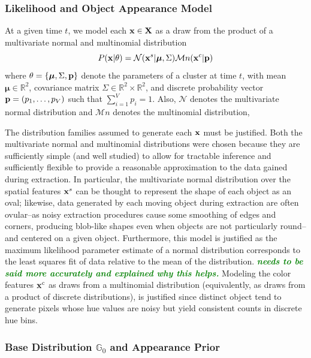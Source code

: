 \documentclass[smallcondensed, final]{svjour3}
\newcommand{\willie}[1]{\textcolor{green}{\textsf{\emph{\textbf{\textcolor{green}{#1}}}}}}
\begin{document}
\subsubsection{Likelihood and Object Appearance Model}

At a given time $t$, we model each $\bold{x} \in \bold{X}$ as a draw from the product of a multivariate normal and multinomial distribution
\begin{equation}
P(\bold{x}|\theta) = \mathcal{N}(\bold{x}^{s} | \boldsymbol{\mu}, \Sigma)  \mathcal{M}n(\bold{x}^{c} | \bold{p})
\end{equation}
where $\theta = \{ \boldsymbol{\mu}, \Sigma, \bold{p} \}$ denote the parameters of a cluster at time $t$, with mean $\boldsymbol{\mu} \in \mathbb{R}^{2}$, covariance matrix $\Sigma \in \mathbb{R}^{2} \times \mathbb{R}^{2}$, and discrete probability vector $\bold{p} = (p_{1}, \ldots, p_{V})$ such that $\sum_{i=1}^{V}p_{i} = 1$. Also, $\mathcal{N}$ denotes the multivariate normal distribution and $\mathcal{M}n$ denotes the multinomial distribution, 

The distribution families assumed to generate each $\bold{x}$ must be justified. Both the multivariate normal and multinomial distributions were chosen because they are sufficiently simple (and well studied) to allow for tractable inference and sufficiently flexible to provide a reasonable approximation to the data gained during extraction. In particular, the multivariate normal distribution over the spatial features $\bold{x}^{s}$ can be thought to represent the shape of each object as an oval; likewise, data generated by each moving object during extraction are often ovular--as noisy extraction procedures cause some smoothing of edges and corners, producing blob-like shapes even when objects are not particularly round--and centered on a given object. Furthermore, this model is justified as the maximum likelihood parameter estimate of a normal distribution corresponds to the least squares fit of data relative to the mean of the distribution. \willie{needs to be said more accurately and explained why this helps.} Modeling the color features $\bold{x}^{c}$ as draws from a multinomial distribution (equivalently, as draws from a product of discrete distributions), is justified since distinct object tend to generate pixels whose hue values are noisy but yield consistent counts in discrete hue bins.



\subsubsection{Base Distribution $\mathbb{G}_{0}$ and Appearance Prior}
\end{document}
